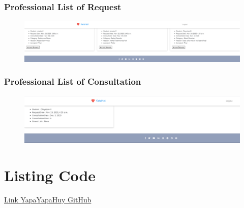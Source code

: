 \documentclass{article}
\begin{document}
	\subsubsection{Professional List of Request}
	\begin{figure}[H]
		\centering
		\includegraphics[width=480px]{Prof List.png}
	\end{figure}

	\subsubsection{Professional List of Consultation}
	\begin{figure}[H]
		\centering
		\includegraphics[width=480px]{Prof Active List.png}
	\end{figure}

	\section{Listing Code}
	\href{https://github.com/YapaYapaHuy/Final-Project-PPPL}{Link YapaYapaHuy GitHub}
\end{document}
